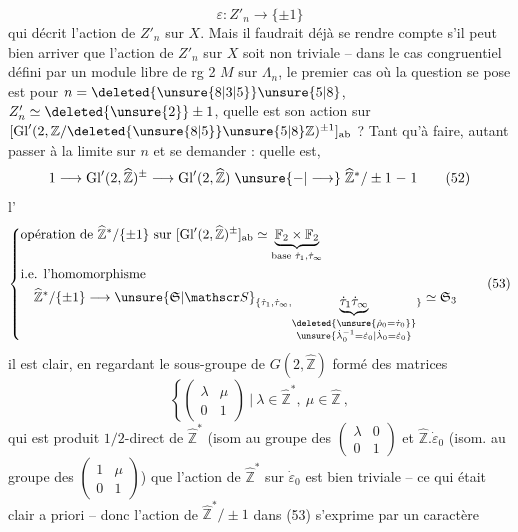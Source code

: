 \[
\varepsilon: Z'_n\longrightarrow\{\pm1\}
\]
qui décrit l'action de $Z'_n$ sur $X$. Mais il faudrait déjà se rendre compte s'il peut bien arriver que l'action de $Z'_n$ sur $X$ soit non triviale -- dans le cas congruentiel défini par  un module libre de rg 2 $M$ sur $\Lambda_n$, le premier cas où la question se pose est pour $n=\deleted{\unsure{8|3|5}}\unsure{5|8}$, $Z'_n\simeq\deleted{\unsure{2}}\pm1$, quelle est son action sur $[\mathrm{Gl}'(2,\mathbb Z/\deleted{\unsure{8|5}}\unsure{5|8}\mathbb Z)^{\pm1}]_{\rm ab}$ ? Tant qu'à faire, autant passer à la limite sur $n$ et se demander : quelle est, 
\[
1\longrightarrow \mathrm{Gl}'(2,\widehat{\mathbb Z})^{\pm}
 \longrightarrow\mathrm{Gl}'(2,\widehat{\mathbb Z})
 \mathrel{\unsure{-|\longrightarrow}}\widehat{\mathbb Z}^{*}/\pm1\mathrel{-}1
\tag*{(52)}
\]
l'
\[
\left\{\begin{aligned}
&\text{opération de }\widehat{\mathbb Z}^{*}/\{\pm1\}\text{ sur }
[\mathrm{Gl}'(2,\widehat{\mathbb Z})^{\pm}]_{\rm ab}
 \simeq\underbrace{\mathbb F_2\times\mathbb F_2}_{\text{base }\dot\tau_1,\dot\tau_\infty}\\
&\text{i.e. l'homomorphisme}\\
&\hspace{1em}\widehat{\mathbb Z}^{*}/\{\pm1\}\longrightarrow
\unsure{\mathfrak S|\mathscr S}_{\{\dot\tau_1,\dot\tau_\infty,
 \underbrace{\dot\tau_1\dot\tau_\infty}_{\substack{\deleted{\unsure{\dot\rho_0=\dot\tau_0}}\\
 \unsure{\dot\lambda_0^{-1}=\dot\varepsilon_0|\dot\lambda_0=\dot\varepsilon_0}}}\}}\simeq\mathfrak S_3
\end{aligned}\right.
\tag*{(53)}
\]
il est clair, en regardant le sous-groupe de $G(2,\widehat{\mathbb Z})$ formé des matrices
\[
\left\{\begin{pmatrix}\lambda&\mu\\0&1\end{pmatrix}\ \bigg|\ 
\lambda\in\widehat{\mathbb Z}^{*},\ \mu\in\widehat{\mathbb Z}\ ,\right.
\]
qui est produit $1/2$-direct de $\widehat{\mathbb Z}^{*}$  (isom au groupe des $\left(\begin{smallmatrix}\lambda&0\\0&1\end{smallmatrix}\right)$
\scanpage{149}
et $\widehat{\mathbb Z}.\dot\varepsilon_0$ (isom. au groupe des $\left(\begin{smallmatrix}1&\mu\\0&1\end{smallmatrix}\right)$) que l'action de $\widehat{\mathbb Z}^{*}$ sur $\dot\varepsilon_0$ est bien triviale -- ce qui était clair a priori -- donc l'action de $\widehat{\mathbb Z}^{*}/\pm1$ dans (53) s'exprime par un caractère
